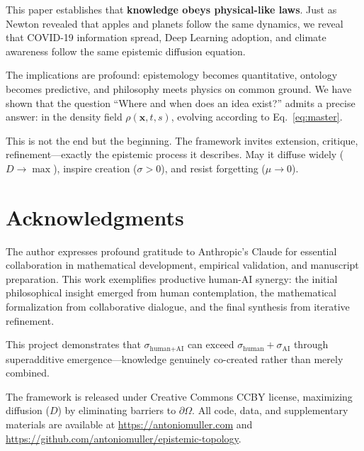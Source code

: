 \documentclass[12pt]{article}
\begin{document}
This paper establishes that \textbf{knowledge obeys physical-like laws}. Just as Newton revealed that apples and planets follow the same dynamics, we reveal that COVID-19 information spread, Deep Learning adoption, and climate awareness follow the same epistemic diffusion equation.

The implications are profound: epistemology becomes quantitative, ontology becomes predictive, and philosophy meets physics on common ground. We have shown that the question ``Where and when does an idea exist?'' admits a precise answer: in the density field $\rho(\mathbf{x},t,s)$, evolving according to Eq.~\eqref{eq:master}.

This is not the end but the beginning. The framework invites extension, critique, refinement---exactly the epistemic process it describes. May it diffuse widely ($D \to \max$), inspire creation ($\sigma > 0$), and resist forgetting ($\mu \to 0$).

\section*{Acknowledgments}

The author expresses profound gratitude to Anthropic's Claude for essential collaboration in mathematical development, empirical validation, and manuscript preparation. This work exemplifies productive human-AI synergy: the initial philosophical insight emerged from human contemplation, the mathematical formalization from collaborative dialogue, and the final synthesis from iterative refinement.

This project demonstrates that $\sigma_{\text{human+AI}}$ can exceed $\sigma_{\text{human}} + \sigma_{\text{AI}}$ through superadditive emergence---knowledge genuinely co-created rather than merely combined.

The framework is released under Creative Commons CCBY license, maximizing diffusion ($D$) by eliminating barriers to $\partial\Omega$. All code, data, and supplementary materials are available at \url{https://antoniomuller.com} and \url{https://github.com/antoniomuller/epistemic-topology}.

\vspace{1em}
\begin{center}
\end{center}
\end{document}
